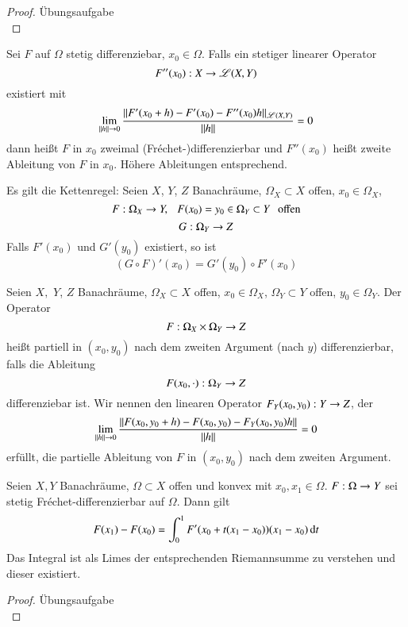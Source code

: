 \begin{proof} 
    Übungsaufgabe \[\]
\end{proof}

\begin{defi}
    Sei $F$ auf $\Omega$ stetig differenziebar, $x_0\in \Omega$. Falls ein stetiger linearer Operator
    \[
        F''(x_0):X\rightarrow \mathscr L(X,Y)
    \]
    existiert mit
    \[
        \lim_{\|h\|\rightarrow 0}\frac{\|F'(x_0+h)-F'(x_0)-F''(x_0)h\|_{\mathscr L(X,Y)}}{\|h\|}=0
    \]
    dann heißt $F$ in $x_0$ zweimal (Fréchet-)differenzierbar und $F''(x_0)$ heißt zweite Ableitung
    von $F$ in $x_0$. Höhere Ableitungen entsprechend.
\end{defi}

\begin{remark}
    Es gilt die Kettenregel:
    Seien $X$, $Y$, $Z$ Banachräume, $\Omega_X\subset X$ offen, $x_0\in \Omega_X$,
    \[
        F:\Omega_X\rightarrow Y, \hspace{.25cm} F(x_0)=y_0\in \Omega_Y\subset Y \hspace{.25cm} \text{offen}
    \]
    \[
        G:\Omega_Y\rightarrow Z
    \]
    Falls $F'(x_0)$ und $G'(y_0)$ existiert, so ist 
    \[
    (G\circ F)'(x_0)=G'(y_0)\circ F'(x_0)
    \]
\end{remark}

\begin{defi}
    Seien $X,$ $Y$, $Z$ Banachräume, $\Omega_X\subset X$ offen, $x_0\in \Omega_X$, $\Omega_Y\subset Y$ 
    offen, $y_0\in \Omega_Y$. Der Operator
    \[
        F: \Omega_X \times \Omega_Y \rightarrow Z 
    \]
    heißt partiell in $(x_0,y_0)$ nach dem zweiten Argument (nach $y$) differenzierbar, falls die 
    Ableitung 
    \[
        F(x_0, \cdot) : \Omega_Y \rightarrow Z 
    \]
    differenziebar ist. Wir nennen den linearen Operator $F_Y(x_0,y_0): Y\rightarrow Z$, der
    \[
        \lim_{\|h\|\rightarrow 0} \frac{\| F(x_0,y_0+h) - F(x_0,y_0) - F_Y( x_0,y_0)h \|}{\|h\|} = 0 
    \]
    erfüllt, die partielle Ableitung von $F$ in $(x_0,y_0)$ nach dem zweiten Argument.
\end{defi}

\begin{prop}
    Seien $X,Y$ Banachräume, $\Omega \subset X $ offen und konvex mit $x_0, x_1\in \Omega$. 
    $F: \Omega \rightarrow Y$ sei stetig Fréchet-differenzierbar auf $\Omega$. Dann gilt
    \[
        F(x_1)-F(x_0)=\int_{0}^1 F'(x_0+t(x_1-x_0))(x_1-x_0)\, \mathrm{d} t
    \]
    Das Integral ist als Limes der entsprechenden Riemannsumme zu verstehen und dieser existiert.
\end{prop}

\begin{proof}
    Übungsaufgabe \[\]
\end{proof}

